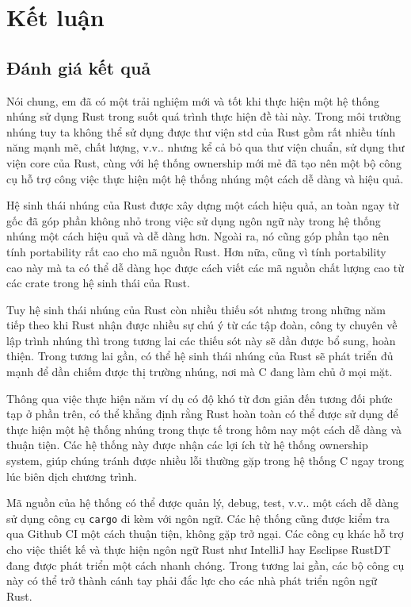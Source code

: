 \chapter{Kết luận}
\section{Đánh giá kết quả}
Nói chung, em đã có một trải nghiệm mới và tốt khi thực hiện một hệ thống nhúng sử dụng Rust trong suốt quá trình thực hiện đề tài này.
Trong môi trường nhúng tuy ta không thể sử dụng được thư viện std của Rust gồm rất nhiều tính năng mạnh mẽ, chất lượng, v.v.. nhưng kể cả bỏ qua thư viện chuẩn, sử dụng thư viện core của Rust, cùng với hệ thống ownership mới mẻ đã tạo nên một bộ công cụ hỗ trợ công việc thực hiện một hệ thống nhúng một cách dễ dàng và hiệu quả.

Hệ sinh thái nhúng của Rust được xây dựng một cách hiệu quả, an toàn ngay từ gốc đã góp phần không nhỏ trong việc sử dụng ngôn ngữ này trong hệ thống nhúng một cách hiệu quả và dễ dàng hơn. Ngoài ra, nó cũng góp phần tạo nên tính portability rất cao cho mã nguồn Rust. Hơn nữa, cũng vì tính portability cao này mà ta có thể dễ dàng học được cách viết các mã nguồn chất lượng cao từ các crate trong hệ sinh thái của Rust.

Tuy hệ sinh thái nhúng của Rust còn nhiều thiếu sót nhưng trong những năm tiếp theo khi Rust nhận được nhiều sự chú ý từ các tập đoàn, công ty chuyên về lập trình nhúng thì trong tương lai các thiếu sót này sẽ dần được bổ sung, hoàn thiện. Trong tương lai gần, có thể hệ sinh thái nhúng của Rust sẽ phát triển đủ mạnh để dần chiếm được thị trường nhúng, nơi mà C đang làm chủ ở mọi mặt.

Thông qua việc thực hiện năm ví dụ có độ khó từ đơn giản đến tương đối phức tạp ở phần trên, có thể khẳng định rằng Rust hoàn toàn có thể được sử dụng để thực hiện một hệ thống nhúng trong thực tế trong hôm nay một cách dễ dàng và thuận tiện.
Các hệ thống này được nhận các lợi ích từ hệ thống ownership system, giúp chúng tránh được nhiều lỗi thường gặp trong hệ thống C ngay trong lúc biên dịch chương trình.

Mã nguồn của hệ thống có thể được quản lý, debug, test, v.v.. một cách dễ dàng sử dụng công cụ \texttt{cargo} đi kèm với ngôn ngữ.
Các hệ thống cũng được kiểm tra qua Github CI một cách thuận tiện, không gặp trở ngại.
Các công cụ khác hỗ trợ cho việc thiết kế và thực hiện ngôn ngữ Rust như IntelliJ hay Esclipse RustDT đang được phát triển một cách nhanh chóng.
Trong tương lai gần, các bộ công cụ này có thể trở thành cánh tay phải đắc lực cho các nhà phát triển ngôn ngữ Rust.


